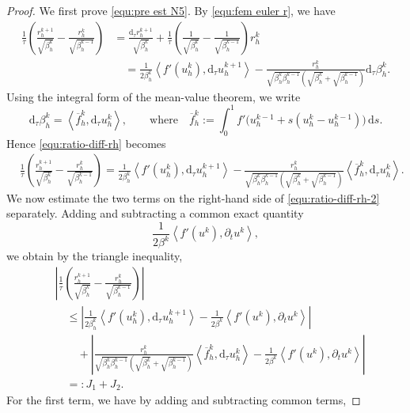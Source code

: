 \documentclass[11pt, reqno]{amsart}
\theoremstyle{definition}
\numberwithin{equation}{section}
\newcommand{\dtt}{\mathrm{d}_\tau}
\newcommand{\ds}{\mathrm{d}s}
\newcommand{\inpro}[2]{\left\langle#1,#2\right\rangle}
\newcommand{\abs}[1]{\left|{#1}\right|}
\begin{document}
\begin{proof}
	We first prove \eqref{equ:pre est N5}. By \eqref{equ:fem euler r}, we have
	\begin{align}
		\frac{1}{\tau}
		\left(
		\frac{r_h^{k+1}}{\sqrt{\beta_h^k}}
		-
		\frac{r_h^k}{\sqrt{\beta_h^{k-1}}}
		\right)
		&=
		\frac{\dtt r_h^{k+1}}{\sqrt{\beta_h^k}}
		+
		\frac{1}{\tau}
		\left(
		\frac{1}{\sqrt{\beta_h^k}}
		-
		\frac{1}{\sqrt{\beta_h^{k-1}}}
		\right) r_h^k
		\nonumber\\
		&\quad
		=
		\frac{1}{2\beta_h^k}
		\inpro{f'(u_h^k)}{\dtt u_h^{k+1}}
		-
		\frac{r_h^k}{\sqrt{\beta_h^k\beta_h^{k-1}}
			(\sqrt{\beta_h^k}+\sqrt{\beta_h^{k-1}})}
		\dtt\beta_h^k .
		\label{equ:ratio-diff-rh}
	\end{align}
	Using the integral form of the mean-value theorem, we write
	\[
	\dtt\beta_h^k
	=
	\inpro{\overline f_h^k}{\dtt u_h^k},
	\qquad \text{where}\quad
	\overline f_h^k
	:=
	\int_0^1
	f'\big(u_h^{k-1}+s(u_h^k-u_h^{k-1})\big)\,\ds .
	\]
	Hence \eqref{equ:ratio-diff-rh} becomes
	\begin{align}
		&\frac{1}{\tau}
		\left(
		\frac{r_h^{k+1}}{\sqrt{\beta_h^k}}
		-
		\frac{r_h^k}{\sqrt{\beta_h^{k-1}}}
		\right)
		=
		\frac{1}{2\beta_h^k}
		\inpro{f'(u_h^k)}{\dtt u_h^{k+1}}
		-
		\frac{r_h^k}{\sqrt{\beta_h^k\beta_h^{k-1}}
			(\sqrt{\beta_h^k}+\sqrt{\beta_h^{k-1}})}
		\inpro{\overline f_h^k}{\dtt u_h^k}.
		\label{equ:ratio-diff-rh-2}
	\end{align}
	We now estimate the two terms on the right-hand side of
	\eqref{equ:ratio-diff-rh-2} separately. Adding and subtracting a common exact
	quantity
	\[
	\frac{1}{2\beta^k}
	\inpro{f'(u^k)}{\partial_t u^k},
	\]
	we obtain by the triangle inequality,
	\begin{align}
		&\abs{
			\frac{1}{\tau}
			\left(
			\frac{r_h^{k+1}}{\sqrt{\beta_h^k}}
			-
			\frac{r_h^k}{\sqrt{\beta_h^{k-1}}}
			\right)}
		\nonumber\\
		&\quad
		\leq
		\abs{
			\frac{1}{2\beta_h^k}
			\inpro{f'(u_h^k)}{\dtt u_h^{k+1}}
			-
			\frac{1}{2\beta^k}
			\inpro{f'(u^k)}{\partial_t u^k}
		}
		\nonumber\\
		&\qquad
		+
		\abs{
			\frac{r_h^k}{\sqrt{\beta_h^k\beta_h^{k-1}}
				(\sqrt{\beta_h^k}+\sqrt{\beta_h^{k-1}})}
			\inpro{\overline f_h^k}{\dtt u_h^k}
			-
			\frac{1}{2\beta^k}
			\inpro{f'(u^k)}{\partial_t u^k}
		}
		\nonumber\\
		&\quad
		=: J_1+J_2 .
		\label{equ:J1-J2-ratio}
	\end{align}
	For the first term, we have by adding and subtracting common terms,

\end{proof}
\end{document}
